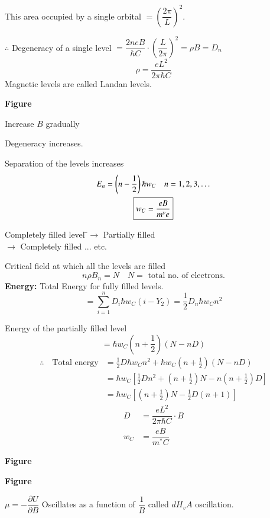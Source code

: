 This area occupied by a single orbital $=\left(\dfrac{2\pi}{L}\right)^{2}$.

$\therefore$ Degeneracy of a single level $=\dfrac{2neB}{\hbar C}\cdot \left(\dfrac{L}{2\pi}\right)^{2}=\rho B=D_{n}$
$$
\rho=\dfrac{eL^{2}}{2\pi\hbar C}
$$
Magnetic levels are called Landan levels.
\begin{center}
{\bf Figure}
\end{center}

Increase $B$ gradually

Degeneracy increases.

Separation of the levels increases
\begin{gather*}
E_{n}=\left(n-\frac{1}{2}\right)\hbar w_{C}\quad n=1,2,3,\ldots\\
\fbox{$w_{C}=\dfrac{eB}{m^{v}e}$}
\end{gather*}

\begin{tabbing}
Completely filled level \=$\to$ Partially filled\\[3pt]
\>$\to$ Completely filled ... etc.
\end{tabbing}

Critical field at which all the levels are filled
$$
n\rho B_{n}=N\quad N=\text{ total no. of electrons.}
$$
{\bf Energy:} Total Energy for fully filled levels.
$$
=\sum\limits^{n}_{i=1}D_{i}\hbar w_{C}(i-Y_{2})=\frac{1}{2}D_{n}\hbar w_{C}n^{2}
$$

Energy of the partially filled level
$$
=\hbar w_{C}\left(n+\frac{1}{2}\right)(N-nD)
$$
\begin{align*}
\therefore\quad \text{Total energy} &= \frac{1}{2}D\hbar w_{C}n^{2}+\hbar w_{C}\left(n+\frac{1}{2}\right)(N-nD)\\
&= \hbar w_{C}\left[\frac{1}{2}Dn^{2}+\left(n+\frac{1}{2}\right)N-n\left(n+\frac{1}{2}\right)D\right]\\
&= \hbar w_{C}\left[\left(n+\frac{1}{2}\right)N-\frac{1}{2}D(n+1)\right]
\end{align*}
\begin{align*}
D &= \dfrac{eL^{2}}{2\pi \hbar C}\cdot B\\
w_{C} &= \dfrac{eB}{m^{*}C}
\end{align*}
\begin{center}
{\bf Figure}

{\bf Figure}
\end{center}

$\mu=-\dfrac{\partial U}{\partial B}$ Oscillates as a function of $\dfrac{1}{B}$ called $dH_{v}A$ oscillation.

